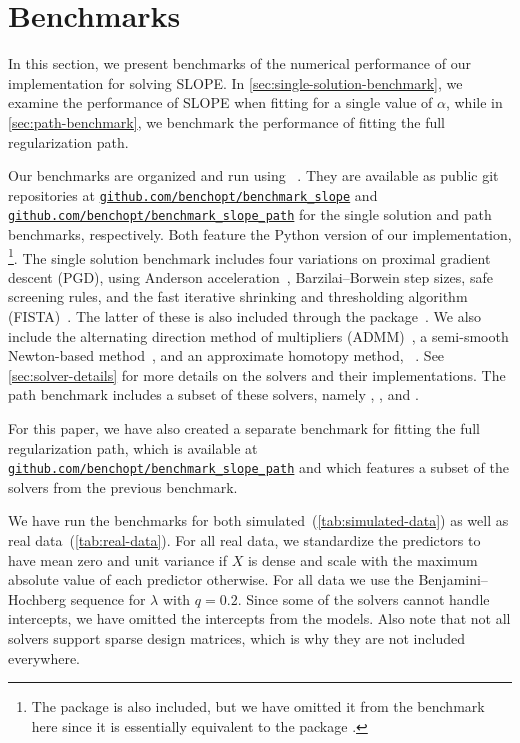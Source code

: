 \documentclass[article]{jss}
\newcommand{\myurl}[1]{\href{https://#1}{\nolinkurl{#1}}}
\begin{document}
\section{Benchmarks}

In this section, we present benchmarks of the numerical performance of our
implementation for solving SLOPE. In \autoref{sec:single-solution-benchmark}, we examine the performance of SLOPE
when fitting for a single value of \(\alpha\), while in
\autoref{sec:path-benchmark}, we benchmark the performance of fitting
the full regularization path.

Our benchmarks are organized and run using ~\citep{moreau2022a}.
They are available as public git repositories at
\myurl{github.com/benchopt/benchmark\_slope} and
\myurl{github.com/benchopt/benchmark\_slope\_path} for the single solution and
path benchmarks, respectively. Both feature the Python version of our
implementation, \footnote{The  package  is
  also included, but we have omitted it from the benchmark here since it is
  essentially equivalent to the  package .}. The
single solution benchmark includes four variations on proximal gradient
descent (PGD), using Anderson acceleration~\citep{anderson1965,zhang2020},
Barzilai--Borwein step sizes, safe screening rules, and the fast iterative
shrinking and thresholding algorithm (FISTA)~\citep{beck2009}. The latter of
these is also included through the  package~\citep{bertrand2022}.
We also include the alternating direction method of multipliers
(ADMM)~\citep{boyd2010}, a semi-smooth Newton-based method~\citep{luo2019},
and an approximate homotopy method, ~\citep{dupuis2024}.
See \autoref{sec:solver-details} for more details on the solvers and their
implementations. The path benchmark includes a subset of these solvers,
namely , , and .

For this paper, we have also created a separate benchmark for fitting the full
regularization path, which is available at
\myurl{github.com/benchopt/benchmark\_slope\_path} and which features a subset
of the solvers from the previous benchmark.

We have run the benchmarks for both simulated~(\autoref{tab:simulated-data}) as
well as real data~(\autoref{tab:real-data}). For all real data, we standardize the
predictors to have mean zero and unit variance if \(X\) is dense and scale with
the maximum absolute value of each predictor otherwise. For all data we use the
Benjamini--Hochberg sequence for \(\lambda\) with \(q=0.2\). Since some of the
solvers cannot handle intercepts, we have omitted the intercepts from the
models. Also note that not all solvers support sparse design matrices, which is
why they are not included everywhere.
\end{document}
